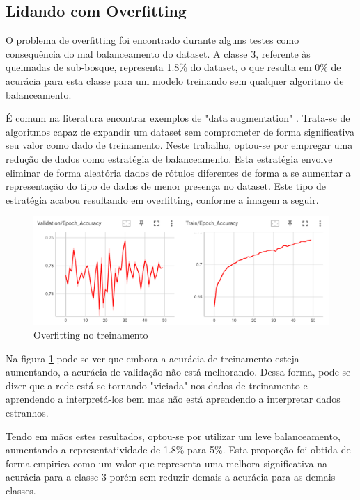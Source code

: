 \subsection{Lidando com Overfitting}
O problema de overfitting foi encontrado durante alguns testes como consequência do mal balanceamento do dataset. A classe 3, referente às queimadas de sub-bosque, representa 1.8\% do dataset, o que resulta em 0\% de acurácia para esta classe para um modelo treinando sem qualquer algoritmo de balanceamento.

É comum na literatura encontrar exemplos de "data augmentation" \cite{survey_data_augmentation}. Trata-se de algoritmos capaz de expandir um dataset sem comprometer de forma significativa seu valor como dado de treinamento. Neste trabalho, optou-se por empregar uma redução de dados como estratégia de balanceamento. Esta estratégia envolve eliminar de forma aleatória dados de rótulos diferentes de forma a se aumentar a representação do tipo de dados de menor presença no dataset. Este tipo de estratégia acabou resultando em overfitting, conforme a imagem a seguir.

\begin{figure}[ht]
    \centering
    \includegraphics[scale=0.5]{tg1/figuras/overfit.png}
    \caption{Overfitting no treinamento}
    \label{fig:overfitting}
\end{figure}

Na figura \ref{fig:overfitting} pode-se ver que embora a acurácia de treinamento esteja aumentando, a acurácia de validação não está melhorando. Dessa forma, pode-se dizer que a rede está se tornando "viciada" nos dados de treinamento e aprendendo a interpretá-los bem mas não está aprendendo a interpretar dados estranhos.

Tendo em mãos estes resultados, optou-se por utilizar um leve balanceamento, aumentando a representatividade de 1.8\% para 5\%. Esta proporção foi obtida de forma empirica como um valor que representa uma melhora significativa na acurácia para a classe 3 porém sem reduzir demais a acurácia para as demais classes.


